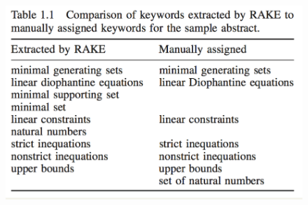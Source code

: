\begin{enumerate}
\begin{description}
			\begin{figure}
				\label{img:rakeScoring}
				\includegraphics[width=\textwidth]{Images/rakeComparison}
			\end{figure}

	   \end{description}
\end{enumerate}

